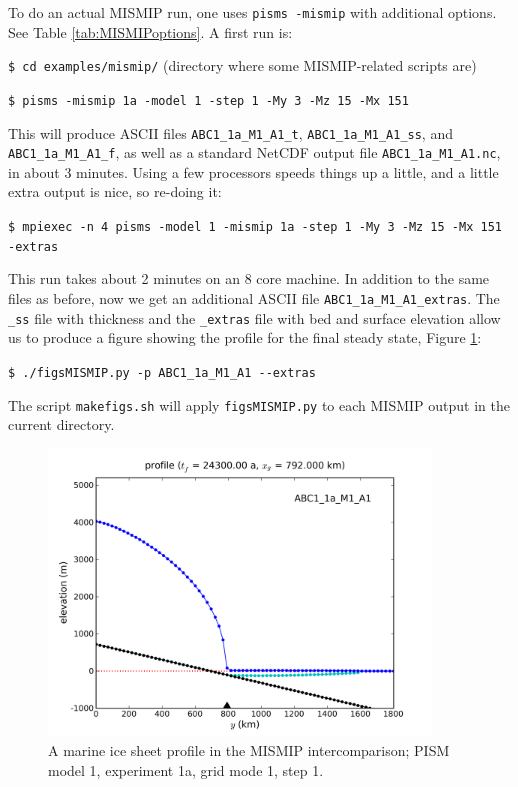 \documentclass[11pt,final]{amsart}
\begin{document}
To do an actual MISMIP run, one uses \verb|pisms -mismip| with additional options.  See Table \ref{tab:MISMIPoptions}.  A first run is:

\verb|$ cd examples/mismip/|  \hfill \scriptsize(directory where some MISMIP-related scripts are)\normalsize

\verb|$ pisms -mismip 1a -model 1 -step 1 -My 3 -Mz 15 -Mx 151|

\noindent This will produce ASCII files \verb|ABC1_1a_M1_A1_t|, \verb|ABC1_1a_M1_A1_ss|, and \verb|ABC1_1a_M1_A1_f|, as well as a standard NetCDF output file \verb|ABC1_1a_M1_A1.nc|, in about 3 minutes.  Using a few processors speeds things up a little, and a little extra output is nice, so re-doing it:

\verb|$ mpiexec -n 4 pisms -model 1 -mismip 1a -step 1 -My 3 -Mz 15 -Mx 151 -extras|

\noindent This run takes about 2 minutes on an 8 core machine.  In addition to the same files as before, now we get an additional ASCII file \verb|ABC1_1a_M1_A1_extras|.  The \verb|_ss| file with thickness and the \verb|_extras| file with bed and surface elevation allow us to produce a figure showing the profile for the final steady state, Figure \ref{fig:MISMIPmodel1exper1aM1A1}:

\verb|$ ./figsMISMIP.py -p ABC1_1a_M1_A1 --extras|

\noindent The script \verb|makefigs.sh| will apply \verb|figsMISMIP.py| to each MISMIP output in the current directory.

\begin{figure}[ht]
\includegraphics[width=4.0in,keepaspectratio=true]{figs/profile_EBU1_1a_M1_A1}
\caption{A marine ice sheet profile in the MISMIP intercomparison; PISM model 1, experiment 1a, grid mode 1, step 1.}
\label{fig:MISMIPmodel1exper1aM1A1}
\end{figure}
\end{document}
